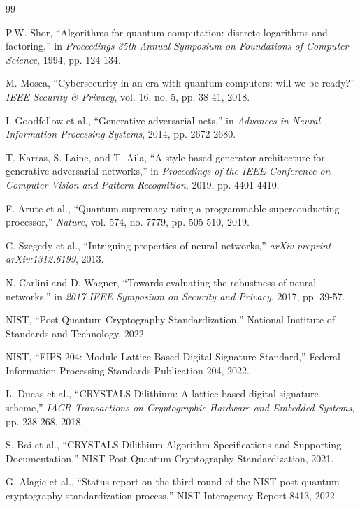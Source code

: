 \documentclass[12pt,a4paper]{article}
\begin{document}
\begin{thebibliography}{99}

P.W. Shor, ``Algorithms for quantum computation: discrete logarithms and factoring,'' in \emph{Proceedings 35th Annual Symposium on Foundations of Computer Science}, 1994, pp. 124-134.

M. Mosca, ``Cybersecurity in an era with quantum computers: will we be ready?'' \emph{IEEE Security \& Privacy}, vol. 16, no. 5, pp. 38-41, 2018.

I. Goodfellow et al., ``Generative adversarial nets,'' in \emph{Advances in Neural Information Processing Systems}, 2014, pp. 2672-2680.

T. Karras, S. Laine, and T. Aila, ``A style-based generator architecture for generative adversarial networks,'' in \emph{Proceedings of the IEEE Conference on Computer Vision and Pattern Recognition}, 2019, pp. 4401-4410.

F. Arute et al., ``Quantum supremacy using a programmable superconducting processor,'' \emph{Nature}, vol. 574, no. 7779, pp. 505-510, 2019.

C. Szegedy et al., ``Intriguing properties of neural networks,'' \emph{arXiv preprint arXiv:1312.6199}, 2013.

N. Carlini and D. Wagner, ``Towards evaluating the robustness of neural networks,'' in \emph{2017 IEEE Symposium on Security and Privacy}, 2017, pp. 39-57.

NIST, ``Post-Quantum Cryptography Standardization,'' National Institute of Standards and Technology, 2022.

NIST, ``FIPS 204: Module-Lattice-Based Digital Signature Standard,'' Federal Information Processing Standards Publication 204, 2022.

L. Ducas et al., ``CRYSTALS-Dilithium: A lattice-based digital signature scheme,'' \emph{IACR Transactions on Cryptographic Hardware and Embedded Systems}, pp. 238-268, 2018.

S. Bai et al., ``CRYSTALS-Dilithium Algorithm Specifications and Supporting Documentation,'' NIST Post-Quantum Cryptography Standardization, 2021.

G. Alagic et al., ``Status report on the third round of the NIST post-quantum cryptography standardization process,'' NIST Interagency Report 8413, 2022.


\end{thebibliography}
\end{document}
